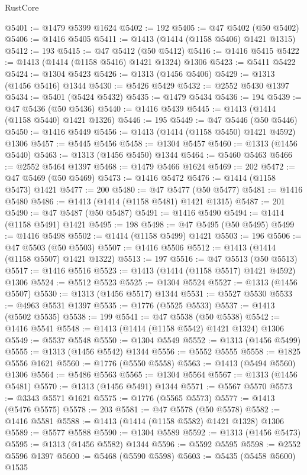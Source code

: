 \begin{lexlean}{RustCore}
\begin{coremodule}
@5401 := @1479 @5399 @1624
@5402 := 192
@5405 := @47 @5402 (@50 @5402)
@5406 := @1416 @5405
@5411 := @1413 (@1414 (@1158 @5406) @1421 @1315)
@5412 := 193
@5415 := @47 @5412 (@50 @5412)
@5416 := @1416 @5415
@5422 := @1413 (@1414 (@1158 @5416) @1421 @1324) @1306
@5423 := @5411 @5422
@5424 := @1304 @5423
@5426 := @1313 (@1456 @5406)
@5429 := @1313 (@1456 @5416) @1344
@5430 := @5426 @5429
@5432 := @2552 @5430 @1397
@5434 := @5401 (@5424 @5432)
@5435 := @1479 @5434
@5436 := 194
@5439 := @47 @5436 (@50 @5436)
@5440 := @1416 @5439
@5445 := @1413 (@1414 (@1158 @5440) @1421 @1326)
@5446 := 195
@5449 := @47 @5446 (@50 @5446)
@5450 := @1416 @5449
@5456 := @1413 (@1414 (@1158 @5450) @1421 @4592) @1306
@5457 := @5445 @5456
@5458 := @1304 @5457
@5460 := @1313 (@1456 @5440)
@5463 := @1313 (@1456 @5450) @1344
@5464 := @5460 @5463
@5466 := @2552 @5464 @1397
@5468 := @1479 @5466 @1624
@5469 := 202
@5472 := @47 @5469 (@50 @5469)
@5473 := @1416 @5472
@5476 := @1414 (@1158 @5473) @1421
@5477 := 200
@5480 := @47 @5477 (@50 @5477)
@5481 := @1416 @5480
@5486 := @1413 (@1414 (@1158 @5481) @1421 @1315)
@5487 := 201
@5490 := @47 @5487 (@50 @5487)
@5491 := @1416 @5490
@5494 := @1414 (@1158 @5491) @1421
@5495 := 198
@5498 := @47 @5495 (@50 @5495)
@5499 := @1416 @5498
@5502 := @1414 (@1158 @5499) @1421
@5503 := 196
@5506 := @47 @5503 (@50 @5503)
@5507 := @1416 @5506
@5512 := @1413 (@1414 (@1158 @5507) @1421 @1322)
@5513 := 197
@5516 := @47 @5513 (@50 @5513)
@5517 := @1416 @5516
@5523 := @1413 (@1414 (@1158 @5517) @1421 @4592) @1306
@5524 := @5512 @5523
@5525 := @1304 @5524
@5527 := @1313 (@1456 @5507)
@5530 := @1313 (@1456 @5517) @1344
@5531 := @5527 @5530
@5533 := @4963 @5531 @1397
@5535 := @1776 (@5525 @5533)
@5537 := @1413 (@5502 @5535)
@5538 := 199
@5541 := @47 @5538 (@50 @5538)
@5542 := @1416 @5541
@5548 := @1413 (@1414 (@1158 @5542) @1421 @1324) @1306
@5549 := @5537 @5548
@5550 := @1304 @5549
@5552 := @1313 (@1456 @5499)
@5555 := @1313 (@1456 @5542) @1344
@5556 := @5552 @5555
@5558 := @1825 @5556 @1621
@5560 := @1776 (@5550 @5558)
@5563 := @1413 (@5494 @5560) @1306
@5564 := @5486 @5563
@5565 := @1304 @5564
@5567 := @1313 (@1456 @5481)
@5570 := @1313 (@1456 @5491) @1344
@5571 := @5567 @5570
@5573 := @3343 @5571 @1621
@5575 := @1776 (@5565 @5573)
@5577 := @1413 (@5476 @5575)
@5578 := 203
@5581 := @47 @5578 (@50 @5578)
@5582 := @1416 @5581
@5588 := @1413 (@1414 (@1158 @5582) @1421 @1328) @1306
@5589 := @5577 @5588
@5590 := @1304 @5589
@5592 := @1313 (@1456 @5473)
@5595 := @1313 (@1456 @5582) @1344
@5596 := @5592 @5595
@5598 := @2552 @5596 @1397
@5600 := @5468 (@5590 @5598)
@5603 := @5435 (@5458 @5600) @1535

\end{coremodule}
\end{lexlean}
